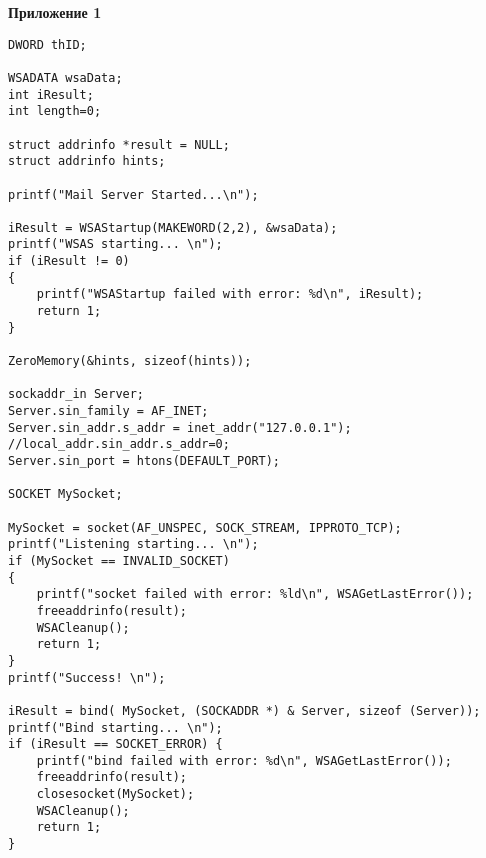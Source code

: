 \documentclass[a4paper,14pt]{article}
\begin{document}
\textbf{Приложение 1}
\begin{lstlisting}
DWORD thID;

WSADATA wsaData;
int iResult; 
int length=0;

struct addrinfo *result = NULL;
struct addrinfo hints;

printf("Mail Server Started...\n");

iResult = WSAStartup(MAKEWORD(2,2), &wsaData);
printf("WSAS starting... \n");
if (iResult != 0) 
{
	printf("WSAStartup failed with error: %d\n", iResult);
	return 1;
}

ZeroMemory(&hints, sizeof(hints));

sockaddr_in Server; 
Server.sin_family = AF_INET;
Server.sin_addr.s_addr = inet_addr("127.0.0.1"); //local_addr.sin_addr.s_addr=0; 
Server.sin_port = htons(DEFAULT_PORT); 

SOCKET MySocket;

MySocket = socket(AF_UNSPEC, SOCK_STREAM, IPPROTO_TCP);
printf("Listening starting... \n");
if (MySocket == INVALID_SOCKET) 
{
	printf("socket failed with error: %ld\n", WSAGetLastError());
	freeaddrinfo(result);
	WSACleanup();
	return 1;
}
printf("Success! \n");

iResult = bind( MySocket, (SOCKADDR *) & Server, sizeof (Server));
printf("Bind starting... \n");
if (iResult == SOCKET_ERROR) {
	printf("bind failed with error: %d\n", WSAGetLastError());
	freeaddrinfo(result);
	closesocket(MySocket);
	WSACleanup();
	return 1;
}
\end{lstlisting}
\end{document}

